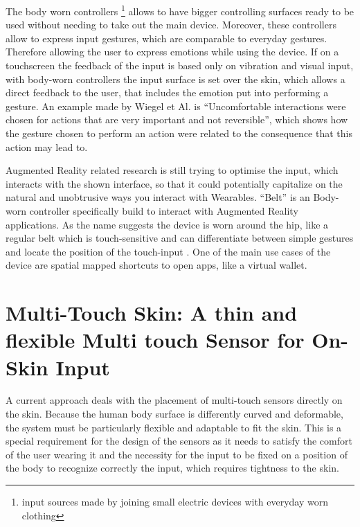 \documentclass{sigchi}
\begin{document}
The body worn controllers \footnote{input sources made by joining small electric devices with everyday worn clothing} %
allows to have bigger controlling surfaces ready to be used without needing to take out the main device. Moreover, these controllers allow to express input gestures, which are comparable to everyday gestures. Therefore allowing the user to express emotions while using the device. If on a touchscreen the feedback of the input is based only on vibration and visual input, with body-worn controllers the input surface is set over the skin, which allows a direct feedback to the user, that includes the emotion put into performing a gesture. An example made by Wiegel et Al. %
\cite[p.185]{more-touch} is “Uncomfortable interactions were chosen for actions that are very important and not reversible”, which shows how the gesture chosen to perform an action were related to the consequence that this action may lead to.


Augmented Reality related research is still trying to optimise the input, which interacts with the shown interface, so that it could potentially capitalize on the natural and unobtrusive ways you interact with Wearables.
“Belt” \cite{belt} is an Body-worn controller specifically build to interact with Augmented Reality applications. As the name suggests the device is worn around the hip, like a regular belt which is touch-sensitive and can differentiate between simple gestures and locate the position of the touch-input \cite[p. 2136]{belt}.%
 One of the main use cases of the device are spatial mapped shortcuts to open apps, like a virtual wallet. \cite{belt}

\section{Multi-Touch Skin: A thin and flexible Multi touch Sensor for On-Skin Input}
A current approach deals with the placement of multi-touch sensors directly on the skin. Because the human body surface is differently curved and deformable, the system must be particularly flexible and adaptable to fit the skin. This is a special requirement for the design of the sensors as it needs to satisfy the comfort of the user wearing it%
and the necessity for the input to be fixed on a position of the body to recognize correctly the input, which requires tightness to the skin. \cite{ulbrich2,iSkin}%
\end{document}
